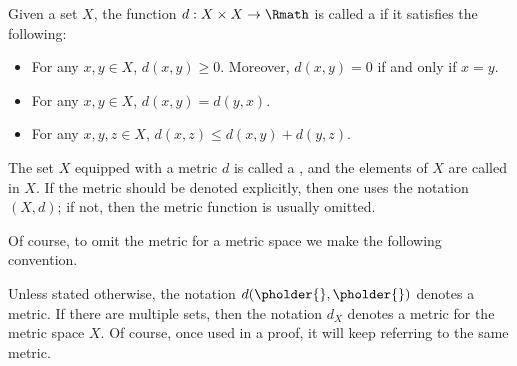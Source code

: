 \begin{definition}
    \label{def:metric}
    Given a set \(X\),
    the function \(d:X\times X\to\Rmath\) is called
    a 
    if it satisfies the following:
    \begin{itemize}
        \item For any \(x,y\in X\), \(d(x,y)\ge 0\).
        Moreover, \(d(x,y)=0\) if and only if \(x=y\).

        \item For any \(x,y\in X\), \(d(x,y)=d(y,x)\).
        
        \item For any \(x,y,z\in X\), \(d(x,z)\le d(x,y)+d(y,z)\).
    \end{itemize}

    The set \(X\) equipped with a metric \(d\)
    is called a ,
    and the elements of \(X\) are called
     in \(X\).
    If the metric should be denoted explicitly,
    then one uses the notation \((X,d)\);
    if not, then the metric function is usually omitted.
\end{definition}

Of course,
to omit the metric for a metric space
we make the following convention.
\begin{convention}
    \label{cnv:metric}
    Unless stated otherwise,
    the notation \(d(\pholder{},\pholder{})\) denotes a metric.
    If there are multiple sets,
    then the notation \(d_X\) denotes a metric
    for the metric space \(X\).
    Of course, once used in a proof,
    it will keep referring to the same metric.
\end{convention}

